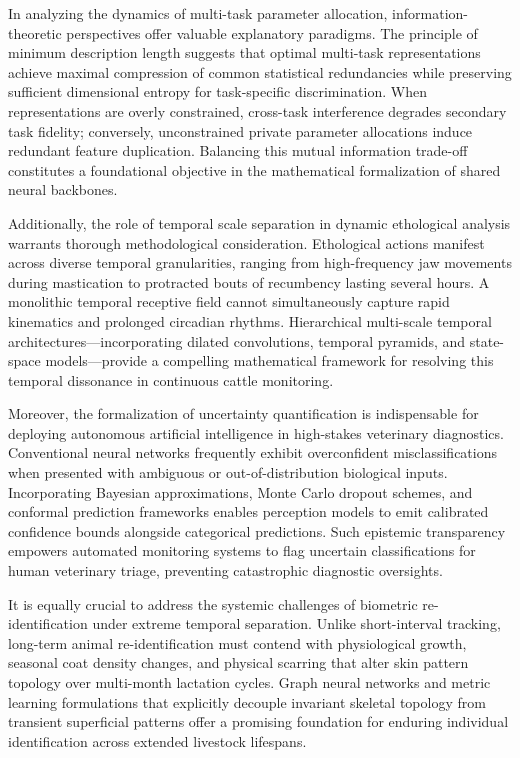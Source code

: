 \documentclass[Times,12pt,oneside,openany,print,index]{report}
\begin{document}
In analyzing the dynamics of multi-task parameter allocation, information-theoretic perspectives offer valuable explanatory paradigms. The principle of minimum description length suggests that optimal multi-task representations achieve maximal compression of common statistical redundancies while preserving sufficient dimensional entropy for task-specific discrimination. When representations are overly constrained, cross-task interference degrades secondary task fidelity; conversely, unconstrained private parameter allocations induce redundant feature duplication. Balancing this mutual information trade-off constitutes a foundational objective in the mathematical formalization of shared neural backbones.

Additionally, the role of temporal scale separation in dynamic ethological analysis warrants thorough methodological consideration. Ethological actions manifest across diverse temporal granularities, ranging from high-frequency jaw movements during mastication to protracted bouts of recumbency lasting several hours. A monolithic temporal receptive field cannot simultaneously capture rapid kinematics and prolonged circadian rhythms. Hierarchical multi-scale temporal architectures—incorporating dilated convolutions, temporal pyramids, and state-space models—provide a compelling mathematical framework for resolving this temporal dissonance in continuous cattle monitoring.

Moreover, the formalization of uncertainty quantification is indispensable for deploying autonomous artificial intelligence in high-stakes veterinary diagnostics. Conventional neural networks frequently exhibit overconfident misclassifications when presented with ambiguous or out-of-distribution biological inputs. Incorporating Bayesian approximations, Monte Carlo dropout schemes, and conformal prediction frameworks enables perception models to emit calibrated confidence bounds alongside categorical predictions. Such epistemic transparency empowers automated monitoring systems to flag uncertain classifications for human veterinary triage, preventing catastrophic diagnostic oversights.

It is equally crucial to address the systemic challenges of biometric re-identification under extreme temporal separation. Unlike short-interval tracking, long-term animal re-identification must contend with physiological growth, seasonal coat density changes, and physical scarring that alter skin pattern topology over multi-month lactation cycles. Graph neural networks and metric learning formulations that explicitly decouple invariant skeletal topology from transient superficial patterns offer a promising foundation for enduring individual identification across extended livestock lifespans.
\end{document}
